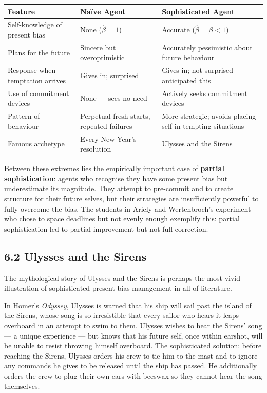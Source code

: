 \documentclass[12pt, letterpaper]{article}
\begin{document}
\begin{table}[H]
\centering
\small
\begin{tabularx}{\linewidth}{lYY}
\toprule
Feature & Naïve Agent & Sophisticated Agent \\
\midrule
Self-knowledge of present bias & None ($\hat{\beta} = 1$) & Accurate ($\hat{\beta} = \beta < 1$) \\
Plans for the future & Sincere but overoptimistic & Accurately pessimistic about future behaviour \\
Response when temptation arrives & Gives in; surprised & Gives in; not surprised --- anticipated this \\
Use of commitment devices & None --- sees no need & Actively seeks commitment devices \\
Pattern of behaviour & Perpetual fresh starts, repeated failures & More strategic; avoids placing self in tempting situations \\
Famous archetype & Every New Year's resolution & Ulysses and the Sirens \\
\bottomrule
\end{tabularx}
\end{table}


Between these extremes lies the empirically important case of \textbf{partial sophistication}: agents who recognise they have some present bias but underestimate its magnitude. They attempt to pre-commit and to create structure for their future selves, but their strategies are insufficiently powerful to fully overcome the bias. The students in Ariely and Wertenbroch's experiment who chose to space deadlines but not evenly enough exemplify this: partial sophistication led to partial improvement but not full correction.


\subsection{6.2 Ulysses and the Sirens}


The mythological story of Ulysses and the Sirens is perhaps the most vivid illustration of sophisticated present-bias management in all of literature.

In Homer's \textit{Odyssey}, Ulysses is warned that his ship will sail past the island of the Sirens, whose song is so irresistible that every sailor who hears it leaps overboard in an attempt to swim to them. Ulysses wishes to hear the Sirens' song --- a unique experience --- but knows that his future self, once within earshot, will be unable to resist throwing himself overboard. The sophisticated solution: before reaching the Sirens, Ulysses orders his crew to tie him to the mast and to ignore any commands he gives to be released until the ship has passed. He additionally orders the crew to plug their own ears with beeswax so they cannot hear the song themselves.
\end{document}
